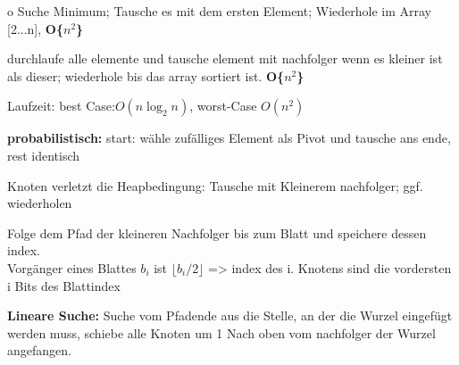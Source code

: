 o
Suche Minimum; Tausche es mit dem ersten Element; Wiederhole im Array [2...n], \textbf{ O\{$n^2$\}}

durchlaufe alle elemente und tausche element mit nachfolger wenn es kleiner ist als dieser; wiederhole bis das array sortiert ist. \textbf{O\{$n^2$\}}

Laufzeit: best Case:$O(n\log_2n)$, worst-Case $O(n^2)$

\textbf{probabilistisch:} start: wähle zufälliges Element als Pivot und tausche ans ende, rest identisch


Knoten verletzt die Heapbedingung: Tausche mit Kleinerem nachfolger; ggf. wiederholen

Folge dem Pfad der kleineren Nachfolger bis zum Blatt und speichere dessen index.\\ 
Vorgänger eines Blattes $b_i$ ist $\lfloor b_i /2 \rfloor $ => index des i. Knotens sind die vordersten i Bits des Blattindex

\textbf{Lineare Suche:}
Suche vom Pfadende aus die Stelle, an der die Wurzel eingefügt werden muss, schiebe alle Knoten um 1 Nach oben vom nachfolger der Wurzel angefangen.

